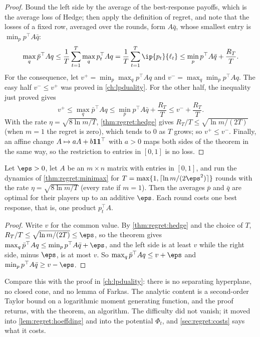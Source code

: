 \begin{refsection}
\begin{proof}
Bound the left side by the average of the best-response payoffs, which is the average loss of Hedge; then apply the definition of regret, and note that the losses of a fixed row, averaged over the rounds, form $A\bar q$, whose smallest entry is $\min_pp^\top A\bar q$:
\[
\max_q\bar p^\top Aq\le\frac1T\sum_{t=1}^T\max_qp_t^\top Aq=\frac1T\sum_{t=1}^T\ip{p_t}{\ell_t}\le\min_pp^\top A\bar q+\frac{R_T}T .
\]
For the consequence, let $v^+=\min_p\max_qp^\top Aq$ and $v^-=\max_q\min_pp^\top Aq$. The easy half $v^-\le v^+$ was proved in \cref{ch:lpduality}. For the other half, the inequality just proved gives
\[
v^+\le\max_q\bar p^\top Aq\le\min_pp^\top A\bar q+\frac{R_T}T\le v^-+\frac{R_T}T .
\]
With the rate $\eta=\sqrt{8\ln m/T}$, \cref{thm:regret:hedge} gives $R_T/T\le\sqrt{\ln m/(2T)}$ (when $m=1$ the regret is zero), which tends to $0$ as $T$ grows; so $v^+\le v^-$. Finally, an affine change $A\mapsto aA+b\mathbf{1}\mathbf{1}^\top$ with $a>0$ maps both sides of the theorem in the same way, so the restriction to entries in $[0,1]$ is no loss.
\end{proof}

\begin{corollary}\label{cor:regret:approx}
Let $\eps>0$, let $A$ be an $m\times n$ matrix with entries in $[0,1]$, and run the dynamics of \cref{thm:regret:minimax} for $T=\max\{1,\lceil\ln m/(2\eps^2)\rceil\}$ rounds with the rate $\eta=\sqrt{8\ln m/T}$ (every rate if $m=1$). Then the averages $\bar p$ and $\bar q$ are optimal for their players up to an additive $\eps$. Each round costs one best response, that is, one product $p_t^\top A$.
\end{corollary}

\begin{proof}
Write $v$ for the common value. By \cref{thm:regret:hedge} and the choice of $T$, $R_T/T\le\sqrt{\ln m/(2T)}\le\eps$, so the theorem gives $\max_q\bar p^\top Aq\le\min_pp^\top A\bar q+\eps$, and the left side is at least $v$ while the right side, minus $\eps$, is at most $v$. So $\max_q\bar p^\top Aq\le v+\eps$ and $\min_pp^\top A\bar q\ge v-\eps$.
\end{proof}

Compare this with the proof in \cref{ch:lpduality}: there is no separating hyperplane, no closed cone, and no lemma of Farkas. The analytic content is a second-order Taylor bound on a logarithmic moment generating function, and the proof returns, with the theorem, an algorithm. The difficulty did not vanish; it moved into \cref{lem:regret:hoeffding} and into the potential $\Phi_t$, and \cref{sec:regret:costs} says what it costs.


\end{refsection}
